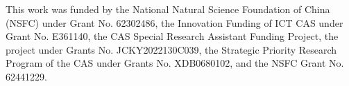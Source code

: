 \documentclass[sigconf]{acmart}
\begin{document}
\begin{abstract}
Our code and datasets can be found at \url{https://github.com/Trustworthy-Information-Access/UtilitySelection}.

\end{abstract}

\maketitle






\begin{acks}
This work was funded by the National Natural Science Foundation of China (NSFC) under Grant No. 62302486, the Innovation Funding of ICT CAS under Grant No. E361140, the CAS Special Research Assistant Funding Project, the project under Grants No. JCKY2022130C039, the Strategic Priority Research Program of the CAS under Grants No. XDB0680102, and the NSFC Grant No. 62441229.
\end{acks}

\balance

% 
\end{document}
